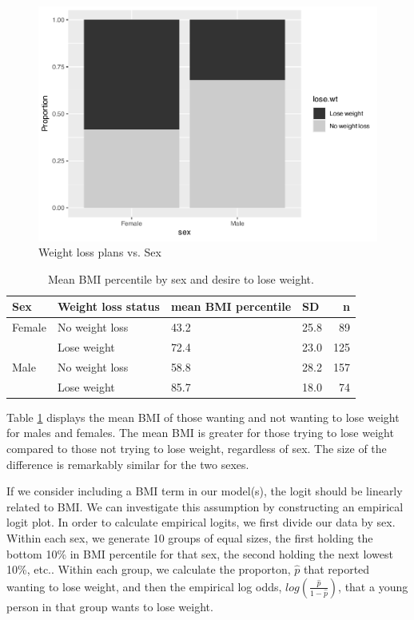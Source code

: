 \documentclass[
]{krantz}
\begin{document}
\begin{figure}

{\centering \includegraphics[width=0.6\linewidth]{bookdown-BeyondMLR_files/figure-latex/mosaicsexlose-1} 

}

\caption{Weight loss plans vs. Sex}\label{fig:mosaicsexlose}
\end{figure}

\begin{table}

\caption{\label{tab:table3chp6}Mean BMI percentile by sex and desire to lose weight.}
\centering
\begin{tabular}[t]{llllr}
\toprule
Sex & Weight loss status & mean BMI percentile & SD & n\\
\midrule
Female & No weight loss & 43.2 & 25.8 & 89\\
 & Lose weight & 72.4 & 23.0 & 125\\
Male & No weight loss & 58.8 & 28.2 & 157\\
 & Lose weight & 85.7 & 18.0 & 74\\
\bottomrule
\end{tabular}
\end{table}

Table \ref{tab:table3chp6} displays the mean BMI of those wanting and not wanting to lose weight for males and females. The mean BMI is greater for those trying to lose weight compared to those not trying to lose weight, regardless of sex. The size of the difference is remarkably similar for the two sexes.

If we consider including a BMI term in our model(s), the logit should be linearly related to BMI. We can investigate this assumption by constructing an empirical logit plot. In order to calculate empirical logits, we first divide our data by sex. Within each sex, we generate 10 groups of equal sizes, the first holding the bottom 10\% in BMI percentile for that sex, the second holding the next lowest 10\%, etc.. Within each group, we calculate the proporton, \(\hat{p}\) that reported wanting to lose weight, and then the empirical log odds, \(log(\frac{\hat{p}}{1-\hat{p}})\), that a young person in that group wants to lose weight.
\end{document}

